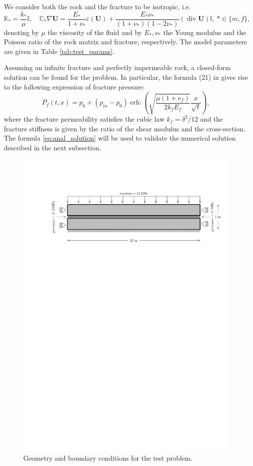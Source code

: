 \documentclass[a4paper]{article}
\numberwithin{equation}{section}
\def\div{\operatorname{div}}
\def\erfc{\operatorname{erfc}}
\def\tn#1{{\mathbb{#1}}}    %
\def\U{\vc U}
\def\vc#1{\mathbf{#1}}     %
\newcommand{\eq}[1]{\begin{equation}#1\end{equation}}
\begin{document}
We consider both the rock and the fracture to be isotropic, i.e.
% 
\eq{ \tn K_*=\frac{k_*}{\mu}\tn I, \quad \tn C_*\nabla\U =\frac{E_*}{1+\nu_*}\varepsilon(\U)+\frac{E_*\nu_*}{(1+\nu_*)(1-2\nu_*)}(\div\U)\tn I, ~*\in\{m,f\}, }
% 
denoting by $\mu$ the viscosity of the fluid and by $E_*,\nu_*$ the Young modulus and the Poisson ratio of the rock matrix and fracture, respectively.
The model parameters are given in Table \ref{tab:test_params}.

Assuming an infinite fracture and perfectly impermeable rock, a closed-form solution can be found for the problem.
In particular, the formula (21) in \cite{Wijesinghe1986} gives rise to the following expression of fracture pressure:
% 
\eq{ \label{eq:anal_solution} P_f(t,x) = p_0 + (p_{in}-p_0)\erfc\left(\sqrt{\frac{\mu(1+\nu_f)}{2 k_f E_f}} \frac{x}{\sqrt{t}}\right), }
%
where the fracture permeability satisfies the cubic law $k_f=\delta^2/12$ and the fracture stiffness is given by the ratio of the shear modulus and the cross-section.
The formula \eqref{eq:anal_solution} will be used to validate the numerical solution described in the next subsection.

\begin{figure}
\centering
\includegraphics[width=\textwidth]{figures/test-cubic-law-bc}
\caption{Geometry and boundary conditions for the test problem.}
\label{fig:test_geom}
\end{figure}
\end{document}
